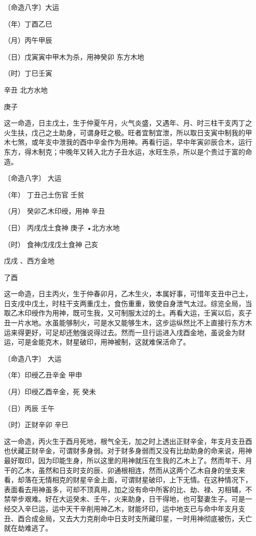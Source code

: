 \documentclass[a5paper,oneside,12pt]{ctexbook}
\begin{document}
〔命造八字〕\hspace{6.4em}大运\par
（年）丁酉\hspace{7.3em}乙巳\par
（月）丙午\hspace{7.3em}甲辰\par
（日）戊寅{\scriptsize{寅中甲木为杀，用神\qquad{}}}癸卯   东方木地\par
（时）丁巳\hspace{7.3em}壬寅\par
\hspace{11.75em}辛丑 北方水地\par
\hspace{11.75em}庚子\par

这一命造，日主戊土，生于仲夏午月，火气炎盛，又遇年、月、时三柱干支丙丁之火生扶，戊己之土助身，可谓身旺之极。旺者宜制宜泄，所以取日支寅中制我的甲木七煞，或年支中泄我的酉中辛金作为用神。再看行运，早中年寅卯辰合木，运行东方，得木制克；中晚年又转入北方子丑水运，水旺生杀，所以是个贵过于富的命造。

〔命造八字〕 大运\par
（年）	丁丑己土伤官	壬贫\par
（月）	癸卯乙木印绶，用神	辛丑\par
（日）	丙戌戊土食神	庚子		•北方水地\par
（时）	食神戊戌戊土食神	己亥\par
		戊戌		、西方金地\par
		了酉\par

这一命造，日主丙火，生于仲春卯月，乙木生火，本属好事，可惜年支丑中己土，日支戌中戊土，时柱干支两重戊土，食伤重重，致使自身泄气太过。综览全局，当取乙木印绶作为用神，既可生我，又可制服太过的土。再看大运，壬寅以后，亥子丑一片水地。水虽能够制火，可是水又能够生木，这步运纵然比不上直接行东方木运来得更好，可足却还勉强说得过去。然而一旦行运进入戌酉金地，虽说金为财运，可是金能克木，财星破印，用神被制，这就难保活命了。

〔命造八字〕	大运\par
（年）印绶乙丑辛金	甲申\par
（月）印绶乙酉辛金，死	癸未\par
（日）丙辰	壬午\par
（时）正财辛卯	辛巳\par

这一命造，丙火生于酉月死地，根气全无，加之时上透出正财辛金，年支月支丑酉也伏藏正财辛金，可谓财多身弱。对于财多身弱而又没有比劫助身的命来说，用神最好取印，因为印能生身，所以这里的用神就压在生我的乙木上了。然而年干、月干的乙木，虽然和日支时支的辰、卯通根相连，然而从这两个乙木自身的坐支来看，却落在无情相克的财星辛金上面，可谓财星破印，上下无情。在这种情况下，表面看去用神虽多，可却不顶真用，加之没有命中所客的比、劫、禄、刃相辅，不禁举步艰难。好在大运癸未、壬午，火来助身，日干得地，也可娶妻生子。可是一经交入辛巳运，运中天干辛削用神乙木，财能坏印，运中地支已与命中年支月支丑、酉合成金局，又去大力克削命中日支时支所藏印星，一时用神彻底被伤，夭亡就在劫难逃了。
\end{document}
